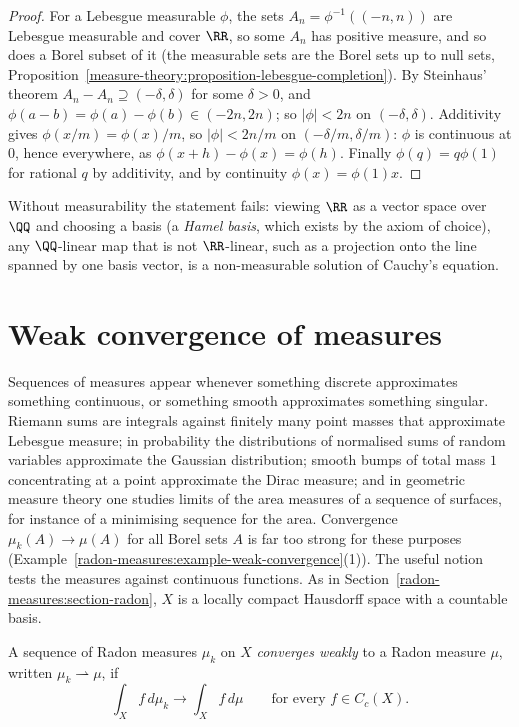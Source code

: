 \begin{proof}
For a Lebesgue measurable $\phi$, the sets $A_n = \phi^{-1}((-n, n))$ are Lebesgue measurable and cover $\RR$, so some $A_n$ has positive measure, and so does a Borel subset of it (the measurable sets are the
Borel sets up to null sets, Proposition~\ref{measure-theory:proposition-lebesgue-completion}). By Steinhaus' theorem $A_n - A_n \supseteq (-\delta, \delta)$ for some $\delta > 0$, and
$\phi(a - b) = \phi(a) - \phi(b) \in (-2n, 2n)$; so $|\phi| < 2n$ on $(-\delta, \delta)$. Additivity gives $\phi(x/m) = \phi(x)/m$, so $|\phi| < 2n/m$ on $(-\delta/m, \delta/m)$: $\phi$ is continuous at
$0$, hence everywhere, as $\phi(x + h) - \phi(x) = \phi(h)$. Finally $\phi(q) = q\phi(1)$ for rational $q$ by additivity, and by continuity $\phi(x) = \phi(1)x$.
\end{proof}

Without measurability the statement fails: viewing $\RR$ as a vector space over $\QQ$ and choosing a basis (a \emph{Hamel basis}, which exists by the axiom of choice), any $\QQ$-linear map that is not
$\RR$-linear, such as a projection onto the line spanned by one basis vector, is a non-measurable solution of Cauchy's equation.

\section{Weak convergence of measures}\label{radon-measures:section-weak-convergence}

Sequences of measures appear whenever something discrete approximates something continuous, or something smooth approximates something singular. Riemann sums are integrals against finitely many
point masses that approximate Lebesgue measure; in probability the distributions of normalised sums of random variables approximate the Gaussian distribution; smooth bumps of total mass $1$
concentrating at a point approximate the Dirac measure; and in geometric measure theory one studies limits of the area measures of a sequence of surfaces, for instance of a minimising sequence for
the area. Convergence $\mu_k(A) \to \mu(A)$ for all Borel sets $A$ is far too strong for these purposes (Example~\ref{radon-measures:example-weak-convergence}(1)). The useful notion tests the measures
against continuous functions. As in Section~\ref{radon-measures:section-radon}, $X$ is a locally compact Hausdorff space with a countable basis.

\begin{definition}\label{radon-measures:definition-weak-convergence}
A sequence of Radon measures $\mu_k$ on $X$ \emph{converges weakly} to a Radon measure $\mu$, written $\mu_k \rightharpoonup \mu$, if
\[
\int_Xf\,d\mu_k \to \int_Xf\,d\mu \qquad \text{for every } f \in C_c(X).
\]
\end{definition}

